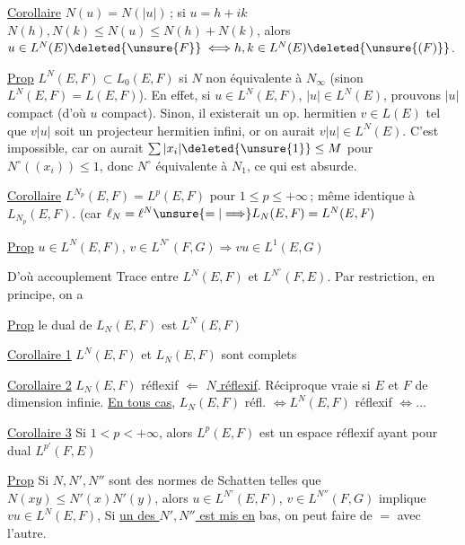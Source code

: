 
\uline{Corollaire} $N(u)=N(|u|)$\,; si $u=h+ik$ $N(h),N(k)\leq N(u)\leq N(h)+N(k)$, alors $u\in L^N(E)\deleted{\unsure{F}}$ \deleted{$\Longleftrightarrow$}$\Longleftrightarrow h,k\in L^N(E)\deleted{\unsure{(F)}}$. 


\uline{Prop} $L^N(E,F)\subset L_0(E,F)$ si $N$ non équivalente à $N_\infty$\unsure{;} (sinon $L^N(E,F)=L(E,F)$). En effet, si $u\in L^N(E,F)$,  $|u|\in L^N(E)$, prouvons $|u|$ compact (d'où $u$ compact). Sinon, il existerait un op. hermitien $v\in L(E)$ tel que $v|u|$ soit un projecteur hermitien infini, or on aurait $v|u|\in L^N(E)$. C'est impossible, car on  aurait $\sum|x_i|\deleted{\unsure{1}}\leq M$ pour $N^\circ((x_i))\leq 1$, donc $N^\circ$ équivalente à $N_1$, ce qui est absurde.

\uline{Corollaire} $L^{N_p}(E,F)=L^p(E,F)$ pour $1\leq p\leq+\infty$\,;  même identique à $L_{N_p}(E,F)$. (car $\ell_N=\ell^N\unsure{=|\Longrightarrow}L_N(E,F)=L^N(E,F)$\unsure{)}

\uline{Prop} $u\in L^N(E,F)$, $v\in L^{N^\circ}(F,G)\Rightarrow vu\in L^1(E,G)$

D'où accouplement Trace entre $L^N(E,F)$ et  $L^{N^\circ}(F,E)$. Par restriction,  en principe, on a

\uline{Prop} le dual de $L_N(E,F)$ est $L^N(E,F)$

\uline{Corollaire 1} $L^N(E,F)$ et $L_N(E,F)$ sont complets

\uline{Corollaire 2} $L_N(E,F)$ réflexif $\Leftarrow$ \uline{$N$ réflexif}.  Réciproque vraie si $E$ et $F$ de dimension infinie. \uline{En tous cas}, $L_N(E,F)$ réfl. $\Longleftrightarrow L^N(E,F)$ réflexif $\Longleftrightarrow\ldots$

\uline{Corollaire 3} Si $1<p<+\infty$, alors $L^p(E,F)$ est un espace réflexif ayant pour dual $L^{p'}(F,E)$

\uline{Prop} Si $N,N',N''$ sont des normes de Schatten telles que $N(xy)\leq N'(x)N'(y)$, alors $u\in L^{N'}(E,F)$, $v\in L^{N''}(F,G)$ implique $vu\in L^N(E,F)$,  Si \uline{un des  $N',N''$ est mis en} bas, on peut faire de $=$ avec l'autre. 

